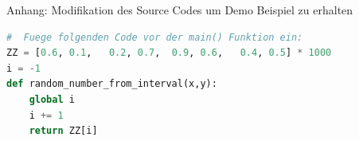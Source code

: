 \begin{frame}[fragile]{Anhang: Modifikation des Source Codes um Demo Beispiel zu erhalten}
  \begin{lstlisting}[language=python]
  #  Fuege folgenden Code vor der main() Funktion ein:
ZZ = [0.6, 0.1,   0.2, 0.7,  0.9, 0.6,   0.4, 0.5] * 1000
i = -1
def random_number_from_interval(x,y):
    global i
    i += 1
    return ZZ[i]
  \end{lstlisting}
\logopythonbottom
\end{frame}

